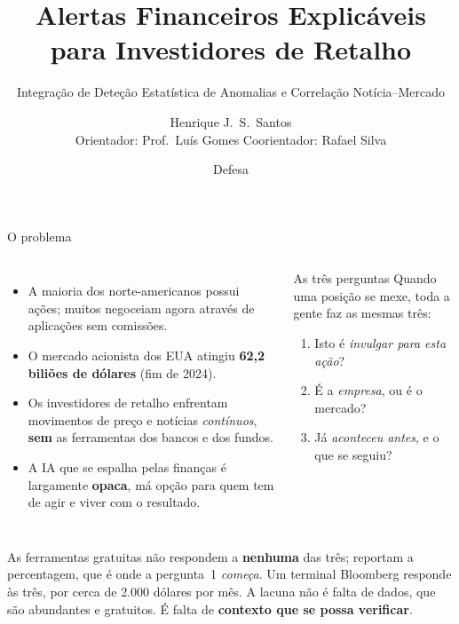 \documentclass[aspectratio=169]{beamer}
\title[InvestiGator]{Alertas Financeiros Explicáveis para Investidores de Retalho}
\subtitle{Integração de Deteção Estatística de Anomalias e Correlação Notícia--Mercado}
\author[H.\ Santos]{Henrique J.\ S.\ Santos \\ \footnotesize Orientador: Prof.\ Lu\'is Gomes \quad Coorientador: Rafael Silva}
\institute[ISEP]{MEIA, Instituto Superior de Engenharia do Porto}
\date{\footnotesize Defesa}
\begin{document}
\begin{frame}\titlepage\end{frame}

\begin{frame}{O problema}
\begin{columns}
\begin{itemize}
  \item A maioria dos norte-americanos possui ações; muitos negoceiam agora através de aplicações sem comissões.
  \item O mercado acionista dos EUA atingiu \textbf{62,2\,biliões de dólares} (fim de 2024).
  \item Os investidores de retalho enfrentam movimentos de preço e notícias \emph{contínuos}, \textbf{sem} as ferramentas dos bancos e dos fundos.
  \item A IA que se espalha pelas finanças é largamente \textbf{opaca}, má opção para quem tem de agir e viver com o resultado.
\end{itemize}
\begin{block}{As três perguntas}
\small
Quando uma posição se mexe, toda a gente faz as mesmas três:
\begin{enumerate}
  \item Isto é \emph{invulgar para esta ação}?
  \item É a \emph{empresa}, ou é o mercado?
  \item Já \emph{aconteceu antes}, e o que se seguiu?
\end{enumerate}
\end{block}
\end{columns}
\vfill
{\small As ferramentas gratuitas não respondem a \textbf{nenhuma} das três; reportam a
percentagem, que é onde a pergunta~1 \emph{começa}. Um terminal Bloomberg responde às três, por
cerca de 2.000 dólares por mês. A lacuna não é falta de dados, que são abundantes e gratuitos.
É falta de \textbf{contexto que se possa verificar}.}
\end{frame}
\end{document}
